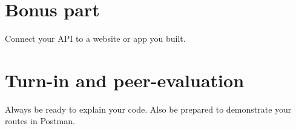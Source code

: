 \documentclass{42-en}
\begin{document}
\chapter{Bonus part}

Connect your API to a website or app you built.

\chapter{Turn-in and peer-evaluation}

Always be ready to explain your code. Also be prepared to demonstrate your routes in Postman.

\end{document}

